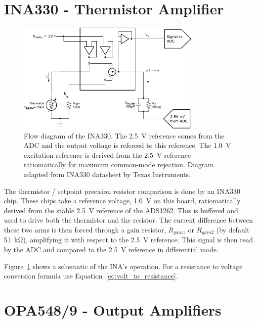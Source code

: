 \documentclass[11pt]{report}
\newcommand{\VExcite}{1.0}
\newcommand{\RGain}{\SI{51}{\kilo\ohm}}
\begin{document}

\section{INA330 - Thermistor Amplifier} %
\label{sub:ina330_thermistor_amplifier}

\begin{figure}[tb]
	\centering
	\includegraphics[width=0.8\textwidth]{INA_Flow/INA_Flow}
	\caption{Flow diagram of the INA330. The \SI{2.5}{\volt} reference comes from the ADC and the output voltage is refereed to this reference. The \SI{\VExcite}{\volt} excitation reference is derived from the \SI{2.5}{\volt} reference ratiomatically for maximum common-mode rejection. Diagram adapted from INA330 datasheet by Texas Instruments.}
	\label{fig:INA_Flow}
\end{figure}

The thermistor / setpoint precision resistor comparison is done by an INA330 chip. These chips take a reference voltage, \SI{\VExcite}{\volt} on this board, ratiomatically derived from the stable \SI{2.5}{\volt} reference of the ADS1262. This is buffered and used to drive both the thermistor and the resistor. The current difference between these two arms is then forced through a gain resistor, $R_{gain1}$ or $R_{gain2}$ (by default \RGain), amplifying it with respect to the \SI{2.5}{\volt} reference. This signal is then read by the ADC and compared to the \SI{2.5}{\volt} reference in differential mode. 

Figure~\ref{fig:INA_Flow} shows a schematic of the INA's operation. 
For a resistance to voltage conversion formula use Equation~\ref{eq:volt_to_resistance}.


\section{OPA548/9 - Output Amplifiers} %
\label{sub:opa548_9_output_amplifiers}
\end{document}
